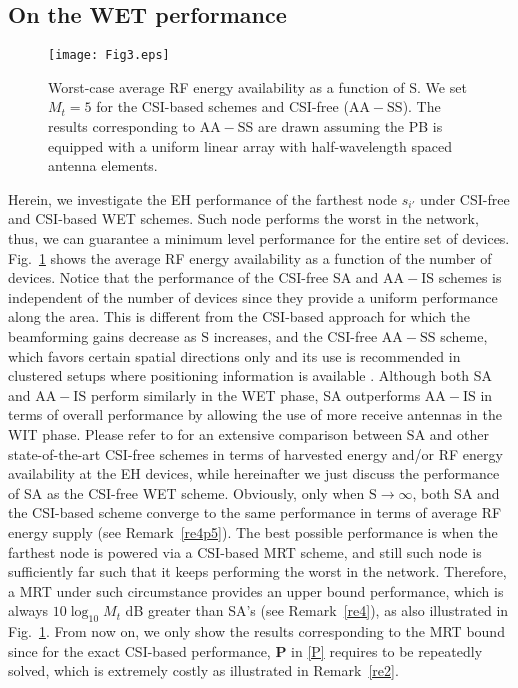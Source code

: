 \documentclass[10pt,journal,a4paper]{IEEEtran}
\begin{document}
	\subsection{On the WET performance}
%
 \begin{figure}[t!]
	\centering
	\texttt{[image: Fig3.eps]}
	\caption{Worst-case average RF energy availability as a function of $\mathrm{S}$. We set $M_t=5$ for the CSI-based schemes and CSI-free ($\mathrm{AA-SS}$). The results corresponding to $\mathrm{AA-SS}$ are drawn assuming the PB is equipped with a uniform linear array with half-wavelength spaced antenna elements.}		
	\label{Fig3}
\end{figure}
%
	Herein, we investigate the EH performance of the farthest node $s_{i'}$ under CSI-free and CSI-based WET schemes. Such node performs the worst in the network, thus, we can guarantee a minimum level performance for the entire set of devices. Fig.~\ref{Fig3} shows the average RF energy availability as a function of the number of devices. Notice that the performance of the CSI-free SA and $\mathrm{AA-IS}$ schemes is independent of the number of devices since they provide a uniform performance along the area. This is different from the CSI-based approach for which the beamforming gains decrease as $\mathrm{S}$ increases, and the CSI-free $\mathrm{AA-SS}$ scheme, which favors certain spatial directions only and its use is recommended in clustered setups where positioning information is available \cite{Lopez.2020,LopezMahmood.2020}.
	Although both SA and $\mathrm{AA-IS}$ perform similarly in the WET phase,  SA outperforms $\mathrm{AA-IS}$ in terms of overall performance by allowing the use of more receive antennas in the WIT phase. Please refer to \cite{Lopez.2020,LopezMahmood.2020} for an extensive comparison between $\mathrm{SA}$ and other state-of-the-art CSI-free schemes in terms of harvested energy and/or RF energy availability at the EH devices, while hereinafter we just discuss the performance of SA as the CSI-free WET scheme. 
	Obviously, only when $\mathrm{S}\rightarrow\infty$, both SA and the CSI-based scheme converge to the same performance in terms of average RF energy  supply (see Remark~\ref{re4p5}).
	The best possible performance is when the farthest node is powered via a  CSI-based MRT scheme, and still such node is sufficiently far such that it keeps performing the worst in the network. Therefore, a MRT under such circumstance provides an upper bound performance, which is always $10\log_{10}M_t$ dB greater than SA's (see Remark~\ref{re4}), as also illustrated in Fig.~\ref{Fig3}. From now on, we only show the results corresponding to the MRT bound since for the exact CSI-based performance, $\mathbf{P}$ in \eqref{P} requires to be repeatedly solved, which is extremely costly as illustrated in Remark~\ref{re2}.
\end{document}
